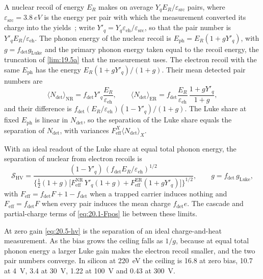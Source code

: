 A nuclear recoil of energy $E_R$ makes on average $Y_qE_R/\varepsilon_{\mathrm{src}}$ pairs, where $\varepsilon_{\mathrm{src}} = \SI{3.8}{eV}$ is the energy per pair with which the measurement converted its charge into the yields~\cite[Eq.~(1)]{albakry2023first}; write $Y'_q = Y_q\varepsilon_{\mathrm{eh}}/\varepsilon_{\mathrm{src}}$, so that the pair number is $Y'_qE_R/\varepsilon_{\mathrm{eh}}$. The phonon energy of the nuclear recoil is $E_{\mathrm{ph}} = E_R(1 + gY'_q)$, with $g = f_{\mathrm{det}}g_{\mathrm{Luke}}$ and the primary phonon energy taken equal to the recoil energy, the truncation of \cref{lim:19.5a} that the measurement uses. The electron recoil with the same $E_{\mathrm{ph}}$ has the energy $E_R(1 + gY'_q)/(1 + g)$. Their mean detected pair numbers are
\begin{equation*}
  \langle N_{\mathrm{det}}\rangle_{\mathrm{NR}} = f_{\mathrm{det}}Y'_q\frac{E_R}{\varepsilon_{\mathrm{eh}}} , \qquad
  \langle N_{\mathrm{det}}\rangle_{\mathrm{ER}} = f_{\mathrm{det}}\frac{E_R}{\varepsilon_{\mathrm{eh}}}\,\frac{1 + gY'_q}{1 + g} ,
\end{equation*}
and their difference is $f_{\mathrm{det}}(E_R/\varepsilon_{\mathrm{eh}})(1 - Y'_q)/(1 + g)$. The Luke share at fixed $E_{\mathrm{ph}}$ is linear in $N_{\mathrm{det}}$, so the separation of the Luke share equals the separation of $N_{\mathrm{det}}$, with variances $F^X_{\mathrm{eff}}\langle N_{\mathrm{det}}\rangle_X$.
\begin{keyresult}
With an ideal readout of the Luke share at equal total phonon energy, the separation of nuclear from electron recoils is
\begin{equation}
  \mathcal{S}_{\mathrm{HV}} = \frac{(1 - Y'_q)\,(f_{\mathrm{det}}E_R/\varepsilon_{\mathrm{eh}})^{1/2}}{\bigl\{\tfrac12(1 + g)\bigl[F^{\mathrm{NR}}_{\mathrm{eff}}\,Y'_q(1 + g) + F^{\mathrm{ER}}_{\mathrm{eff}}(1 + gY'_q)\bigr]\bigr\}^{1/2}} , \qquad g = f_{\mathrm{det}}\,g_{\mathrm{Luke}} ,
  \label{eq:20.5-hv}
\end{equation}
with $F_{\mathrm{eff}} = f_{\mathrm{det}}F + 1 - f_{\mathrm{det}}$ when a trapped carrier induces nothing and $F_{\mathrm{eff}} = f_{\mathrm{det}}F$ when every pair induces the mean charge $f_{\mathrm{det}}e$. The cascade and partial-charge terms of \cref{eq:20.1-Fpos} lie between these limits.
\end{keyresult}
\noindent At zero gain \cref{eq:20.5-hv} is the separation of an ideal charge-and-heat measurement. As the bias grows the ceiling falls as $1/g$, because at equal total phonon energy a larger Luke gain makes the electron recoil smaller, and the two pair numbers converge. In silicon at \SI{220}{eV} the ceiling is 16.8 at zero bias, 10.7 at \SI{4}{V}, 3.4 at \SI{30}{V}, 1.22 at \SI{100}{V} and 0.43 at \SI{300}{V}.

